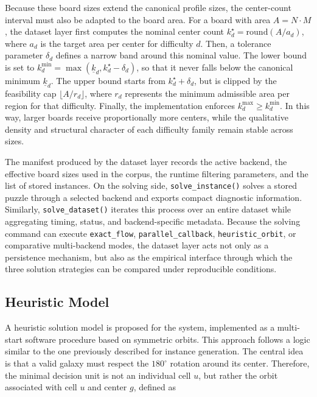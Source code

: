 Because these board sizes extend the canonical profile sizes, the center-count
interval must also be adapted to the board area. For a board with area
\(A = N \cdot M\), the dataset layer first computes the nominal center count
\(k_d^\star = \mathrm{round}(A / a_d)\), where \(a_d\) is the target area per
center for difficulty \(d\). Then, a tolerance parameter \(\delta_d\) defines
a narrow band around this nominal value. The lower bound is set to
\(k_d^{\min} = \max(\underline{k}_d, k_d^\star - \delta_d)\), so that it never
falls below the canonical minimum \(\underline{k}_d\). The upper bound starts
from \(k_d^\star + \delta_d\), but is clipped by the feasibility cap
\(\lfloor A / r_d \rfloor\), where \(r_d\) represents the minimum admissible
area per region for that difficulty. Finally, the implementation enforces
\(k_d^{\max} \geq k_d^{\min}\). In this way, larger boards receive
proportionally more centers, while the qualitative density and structural
character of each difficulty family remain stable across sizes.

The manifest produced by the dataset layer records the active backend, the
effective board sizes used in the corpus, the runtime filtering parameters, and
the list of stored instances. On the solving side, \texttt{solve\_instance()}
solves a stored puzzle through a selected backend and exports compact
diagnostic information. Similarly, \texttt{solve\_dataset()} iterates this
process over an entire dataset while aggregating timing, status, and
backend-specific metadata. Because the solving command can execute
\texttt{exact\_flow}, \texttt{parallel\_callback}, \texttt{heuristic\_orbit},
or comparative multi-backend modes, the dataset layer acts not only as a
persistence mechanism, but also as the empirical interface through which the
three solution strategies can be compared under reproducible conditions.

\subsection{Heuristic Model}
A heuristic solution model is proposed for the system, implemented as a multi-start software procedure based on symmetric orbits. This approach follows a logic similar to the one previously described for instance generation. The central idea is that a valid galaxy must respect the \(180^\circ\) rotation around its center. Therefore, the minimal decision unit is not an individual cell \(u\), but rather the orbit associated with cell \(u\) and center \(g\), defined as

